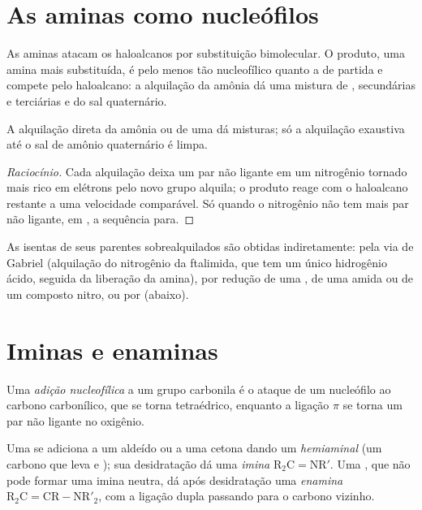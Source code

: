 \section{As aminas como nucleófilos}

As aminas atacam os haloalcanos por substituição bimolecular. O produto, uma
amina mais substituída, é pelo menos tão nucleofílico quanto a de partida e
compete pelo haloalcano: a alquilação da amônia dá uma mistura de , secundárias e terciárias e do sal quaternário.

\begin{proposition}[Polialquilação]\label{prop:b2:amines:polyalkylation}
A alquilação direta da amônia ou de uma  dá misturas; só a
alquilação exaustiva até o sal de amônio quaternário é limpa.
\end{proposition}

\begin{proof}[Raciocínio]
Cada alquilação deixa um par não ligante em um nitrogênio tornado mais rico em
elétrons pelo novo grupo alquila; o produto reage com o haloalcano restante a
uma velocidade comparável. Só quando o nitrogênio não tem mais par não ligante,
em , a sequência para.
\end{proof}

As  isentas de seus parentes sobrealquilados são obtidas
indiretamente: pela via de Gabriel (alquilação do nitrogênio da ftalimida, que
tem um único hidrogênio ácido, seguida da liberação da amina), por redução de
uma , de uma amida ou de um composto nitro, ou por 
(abaixo).

\section{Iminas e enaminas}

\begin{definition}\label{def:b2:amines:nucleophilic-addition}
Uma \emph{adição nucleofílica} a um grupo carbonila é o ataque
de um nucleófilo ao carbono carbonílico, que se torna tetraédrico, enquanto a
ligação $\pi$  se torna um par não ligante no oxigênio.
\end{definition}

\begin{definition}\label{def:b2:amines:imine}
Uma  se adiciona a um aldeído ou a uma cetona dando um
\emph{hemiaminal} (um carbono que leva  e ); sua
desidratação dá uma \emph{imina}
$\mathrm{R_2C{=}NR'}$. Uma , que não pode formar uma imina
neutra, dá após desidratação uma
\emph{enamina} $\mathrm{R_2C{=}CR{-}NR'_2}$, com a ligação dupla
passando para o carbono vizinho.
\end{definition}

